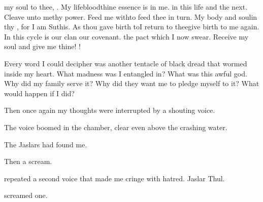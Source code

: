\documentclass
  [a4paper,
   12pt,
   oneside
  ]%
  {article}
\begin{document}
\begin{diary}%
  \prikker my soul to thee, \Ubloth.
  My lifeblood\prikker thine essence is in me. 
  \prikker in this life and the next. 
  Cleave unto me\prikker thy power. 
  Feed me with\prikker to feed thee in turn. 
  My body and soul\prikker in thy \nexus, for I am Suthis. 
  As thou gave birth to\prikker I return to thee\prikker give birth to me again. 
  In this cycle is our clan\prikker 
  \prikker our covenant.
  \prikker the pact which I now swear. 
  Receive my soul and give me thine!
  \Ubloth!%
\end{diary}

Every word I could decipher was another tentacle of black dread that wormed inside my heart. 
What madness was I entangled in?
What was this awful god.
Why did my family serve it? 
Why did they want me to pledge myself to it? 
What would happen if I did?

Then once again my thoughts were interrupted by a shouting voice. 

The voice boomed in the chamber, clear even above the crashing water. 

The Jaslars had found me. 

Then a scream. 


 repeated a second voice that made me cringe with hatred. 
Jaslar Thul.
%
\index{\Isxae}
\index{\Nasshikerr}


 screamed one.
\end{document}
